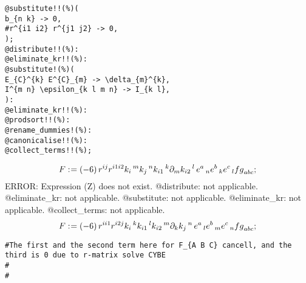 \documentclass[11pt]{article}
\def\specialcolon{\mathrel{\mathop{:}}\hspace{-.5em}}
\begin{document}
{\color[named]{Blue}\begin{verbatim}
@substitute!!(%)(
b_{n k} -> 0,
#r^{i1 i2} r^{j1 j2} -> 0,
);
@distribute!!(%):
@eliminate_kr!!(%):
@substitute!(%)(
E_{C}^{k} E^{C}_{m} -> \delta_{m}^{k},
I^{m n} \epsilon_{k l m n} -> I_{k l},
):
@eliminate_kr!!(%):
@prodsort!!(%):
@rename_dummies!(%):
@canonicalise!!(%):
@collect_terms!!(%);
\end{verbatim}}
\begin{dmath*}[compact, spread=2pt]
F\specialcolon{}= (-6)\, {r}^{i j} {r}^{i1 i2} {k}_{i}\,^{m} {k}_{j}\,^{n} {k}_{i1}\,^{k} {\partial}_{m}{{k}_{i2}\,^{l}}\,  {e}^{a}\,_{n} {e}^{b}\,_{k} {e}^{c}\,_{l} {fg}_{a b c};
\end{dmath*}
{\color[named]{Red}%
ERROR: Expression (Z) does not exist.%
} %
@distribute: not applicable.
@eliminate\_kr: not applicable.
@substitute: not applicable.
@eliminate\_kr: not applicable.
@collect\_terms: not applicable.
\begin{dmath*}[compact, spread=2pt]
F\specialcolon{}= (-6)\, {r}^{i i1} {r}^{i2 j} {k}_{i}\,^{k} {k}_{i1}\,^{l} {k}_{i2}\,^{m} {\partial}_{k}{{k}_{j}\,^{n}}\,  {e}^{a}\,_{l} {e}^{b}\,_{m} {e}^{c}\,_{n} {fg}_{a b c};
\end{dmath*}
{\color[named]{Blue}\begin{verbatim}
#The first and the second term here for F_{A B C} cancell, and the third is 0 due to r-matrix solve CYBE
#
#
\end{verbatim}}
\end{document}

